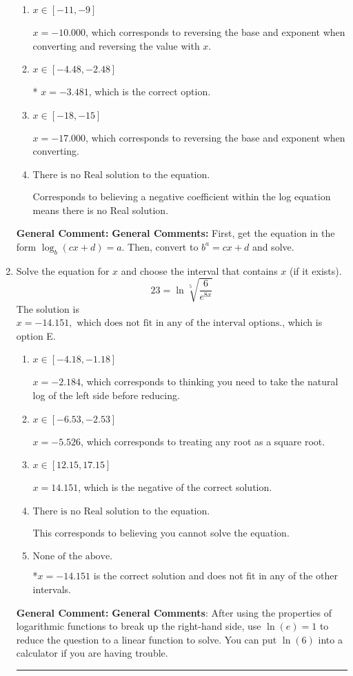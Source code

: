 \documentclass{extbook}[14pt]
\newcommand{\litem}[1]{\item #1

\rule{\textwidth}{0.4pt}}
\begin{document}
\begin{enumerate}
{\begin{enumerate}[label=\Alph*.]
$x = 10.000$, which corresponds to ignoring the vertical shift when converting to exponential form.
\item \( x \in [-11, -9] \)

$x = -10.000$, which corresponds to reversing the base and exponent when converting and reversing the value with $x$.
\item \( x \in [-4.48, -2.48] \)

* $x = -3.481$, which is the correct option.
\item \( x \in [-18, -15] \)

$x = -17.000$, which corresponds to reversing the base and exponent when converting.
\item \( \text{There is no Real solution to the equation.} \)

Corresponds to believing a negative coefficient within the log equation means there is no Real solution.
\end{enumerate}

\textbf{General Comment:} \textbf{General Comments:} First, get the equation in the form $\log_b{(cx+d)} = a$. Then, convert to $b^a = cx+d$ and solve.
}
\litem{
 Solve the equation for $x$ and choose the interval that contains $x$ (if it exists).
\[  23 = \ln{\sqrt[5]{\frac{6}{e^{8x}}}} \]The solution is \( x = -14.151, \text{ which does not fit in any of the interval options.} \), which is option E.\begin{enumerate}[label=\Alph*.]
\item \( x \in [-4.18, -1.18] \)

$x = -2.184$, which corresponds to thinking you need to take the natural log of the left side before reducing.
\item \( x \in [-6.53, -2.53] \)

$x = -5.526$, which corresponds to treating any root as a square root.
\item \( x \in [12.15, 17.15] \)

$x = 14.151$, which is the negative of the correct solution.
\item \( \text{There is no Real solution to the equation.} \)

This corresponds to believing you cannot solve the equation.
\item \( \text{None of the above.} \)

*$x = -14.151$ is the correct solution and does not fit in any of the other intervals.
\end{enumerate}

\textbf{General Comment:} \textbf{General Comments}: After using the properties of logarithmic functions to break up the right-hand side, use $\ln(e) = 1$ to reduce the question to a linear function to solve. You can put $\ln(6)$ into a calculator if you are having trouble.
}
\end{enumerate}
\end{document}
